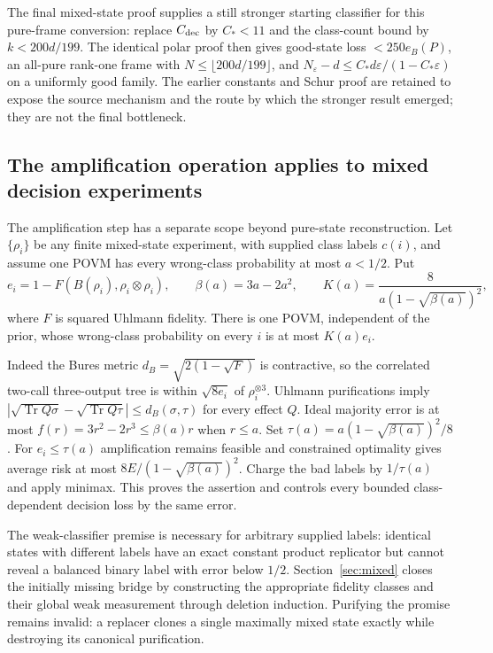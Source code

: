 \documentclass[11pt]{article}
\newcommand{\Tr}{\operatorname{Tr}}
\begin{document}
The final mixed-state proof supplies a still stronger starting classifier for this pure-frame conversion: replace $C_{\rm dec}$ by $C_*<11$ and the class-count bound by $k<200d/199$. The identical polar proof then gives good-state loss $<250e_B(P)$, an all-pure rank-one frame with $N\le\lfloor200d/199\rfloor$, and $N_\varepsilon-d\le C_*d\varepsilon/(1-C_*\varepsilon)$ on a uniformly good family. The earlier constants and Schur proof are retained to expose the source mechanism and the route by which the stronger result emerged; they are not the final bottleneck.

\subsection{The amplification operation applies to mixed decision experiments}

The amplification step has a separate scope beyond pure-state reconstruction. Let $\{\rho_i\}$ be any finite mixed-state experiment, with supplied class labels $c(i)$, and assume one POVM has every wrong-class probability at most $a<1/2$. Put
\[
e_i=1-F(B(\rho_i),\rho_i\otimes\rho_i),\qquad
\beta(a)=3a-2a^2,\qquad
K(a)=\frac8{a(1-\sqrt{\beta(a)})^2},
\]
where $F$ is squared Uhlmann fidelity. There is one POVM, independent of the prior, whose wrong-class probability on every $i$ is at most $K(a)e_i$.

Indeed the Bures metric $d_B=\sqrt{2(1-\sqrt F)}$ is contractive, so the correlated two-call three-output tree is within $\sqrt{8e_i}$ of $\rho_i^{\otimes3}$. Uhlmann purifications imply $|\sqrt{\Tr Q\sigma}-\sqrt{\Tr Q\tau}|\le d_B(\sigma,\tau)$ for every effect $Q$. Ideal majority error is at most $f(r)=3r^2-2r^3\le\beta(a)r$ when $r\le a$. Set $\tau(a)=a(1-\sqrt{\beta(a)})^2/8$. For $e_i\le\tau(a)$ amplification remains feasible and constrained optimality gives average risk at most $8E/(1-\sqrt{\beta(a)})^2$. Charge the bad labels by $1/\tau(a)$ and apply minimax. This proves the assertion and controls every bounded class-dependent decision loss by the same error.

The weak-classifier premise is necessary for arbitrary supplied labels: identical states with different labels have an exact constant product replicator but cannot reveal a balanced binary label with error below $1/2$. Section~\ref{sec:mixed} closes the initially missing bridge by constructing the appropriate fidelity classes and their global weak measurement through deletion induction. Purifying the promise remains invalid: a replacer clones a single maximally mixed state exactly while destroying its canonical purification.
\end{document}
